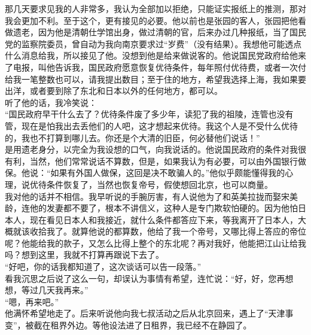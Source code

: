 那几天要求见我的人非常多，我认为全部加以拒绝，只能证实报纸上的推测，那对我会更加不利。至于这个，更有接见的必要。他以前也是张园的客人，张园把他看做遗老，因为他是清朝仕学馆出身，做过清朝的官，后来办过几种报纸，当了国民党的监察院委员，曾自动为我向南京要求过“岁费”（没有结果）。我想他可能透点什么消息给我，所以接见了他。没想到他是给来做说客的。他说国民党政府给他来了电报，叫他告诉我，国民政府愿意恢复优待条件，每年照付优待费，或者一次付给我一笔整数也可以，请我提出数目；至于住的地方，希望我选择上海，我如果要出洋，或者要到除了东北和日本以外的任何地方，都可以。\\

听了他的话，我冷笑说：\\

“国民政府早干什么去了？优待条件废了多少年，读犯了我的祖陵，连管也没有管，现在是怕我出去丢他们的人吧，这才想起来优待。我这个人是不受什么优待的，我也不打算到哪儿去。你还是个大清的旧臣，何必替他们说话！”\\

是用遗老身分，以完全为我设想的口气，向我说话的。他说国民政府的条件对我很有利，当然，他们常常说话不算数，但是，如果我认为有必要，可以由外国银行做保。他说：“如果有外国人做保，这回是决不敢骗人的。”他似乎颇能懂得我的心理，说优待条件恢复了，当然也恢复帝号，假使想回北京，也可以商量。\\

我对他的话并不相信。我早听说的手腕厉害，有人说他为了和英美拉拢而娶宋美龄，连他的发妻都不要了，根本不讲信义，这种人是专门欺软怕硬的。因为他怕日本人，现在看见日本人和我接近，就什么条件都答应下来，等我离开了日本人，大概就该收拾我了。就算他说的都算数，他给了我一个帝号，又哪比得上答应的帝位呢？他能给我的款子，又怎么比得上整个的东北呢？再对我好，他能把江山让给我吗？想到这里，我就不打算再跟说下去了。\\

“好吧，你的话我都知道了，这次谈话可以告一段落。”\\

看我沉思之后说了这么一句，却误认为事情有希望，连忙说：“好，好，您再想想，等过几天我再来。”\\

“嗯，再来吧。”\\

他满怀希望地走了。后来听说他向我七叔活动之后从北京回来，遇上了“天津事变”，被截在租界外边。等他设法进了日租界，我已经不在静园了。\\


